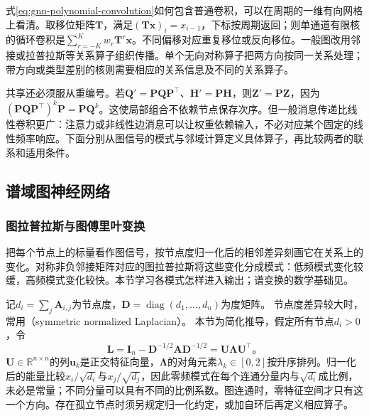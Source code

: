 式\eqref{eq:gnn-polynomial-convolution}如何包含普通卷积，可以在周期的一维有向网格上看清。取移位矩阵$\bm{T}$，满足$(\bm{T}\bm{x})_i=x_{i-1}$，下标按周期返回；则单通道有限核的循环卷积是$\sum_{r=-K}^{K}w_r\bm{T}^{r}\bm{x}$。不同偏移对应重复移位或反向移位。一般图改用邻接或拉普拉斯等关系算子组织传播。单个无向对称算子把两方向按同一关系处理；带方向或类型差别的核则需要相应的关系信息及不同的关系算子。

共享还必须服从重编号。若$\bm{Q}'=\bm{P}\bm{Q}\bm{P}^{\top}$、$\bm{H}'=\bm{P}\bm{H}$，则$\bm{Z}'=\bm{P}\bm{Z}$，因为$(\bm{P}\bm{Q}\bm{P}^{\top})^k\bm{P}=\bm{P}\bm{Q}^k$。这使局部组合不依赖节点保存次序。但一般消息传递比线性卷积更广：注意力或非线性边消息可以让权重依赖输入，不必对应某个固定的线性频率响应。下面分别从图信号的模式与邻域计算定义具体算子，再比较两者的联系和适用条件。

\subsection{谱域图神经网络}
\label{sec:gnn-spectral}

\subsubsection{图拉普拉斯与图傅里叶变换}
\label{sec:gnn-graph-fourier}

把每个节点上的标量看作图信号，按节点度归一化后的相邻差异刻画它在关系上的变化。对称非负邻接矩阵对应的图拉普拉斯将这些变化分成模式：低频模式变化较缓，高频模式变化较快。本节学习各模式怎样进入输出；谱变换的数学基础见。

记$d_i=\sum_j\bm A_{i,j}$为节点度，$\bm D=\operatorname{diag}(d_1,\ldots,d_n)$为度矩阵。
节点度差异较大时，常用（symmetric normalized Laplacian）。
本节为简化推导，假定所有节点$d_i>0$，令
\begin{equation}
  \bm{L}=\bm{I}_n-\bm{D}^{-1/2}\bm{A}\bm{D}^{-1/2}
    =\bm{U}\bm{\Lambda}\bm{U}^{\top}\text{。}
  \label{eq:gnn-laplacian-spectrum}
\end{equation}
$\bm{U}\in\mathbb{R}^{n\times n}$的列$\bm{u}_k$是正交特征向量，$\bm{\Lambda}$的对角元素$\lambda_k\in[0,2]$按升序排列。归一化后的能量比较$x_i/\sqrt{d_i}$与$x_j/\sqrt{d_j}$，因此零频模式在每个连通分量内与$\sqrt{d_i}$成比例，未必是常量；不同分量可以具有不同的比例系数。图连通时，零特征空间才只有这一个方向。存在孤立节点时须另规定归一化约定，或加自环后再定义相应算子。

